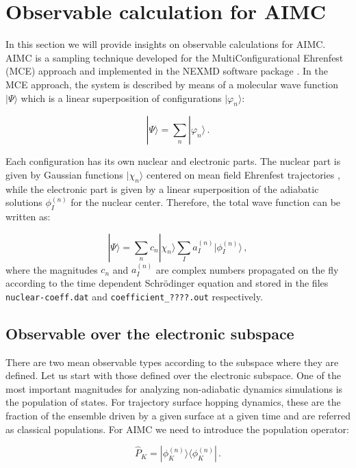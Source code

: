 \section{Observable calculation for AIMC}

In this section we will provide insights on observable calculations for AIMC. AIMC is a sampling technique developed for the MultiConfigurational Ehrenfest (MCE) approach and implemented in the NEXMD software package \cite{freixas2018ab}. In the MCE approach, the system is described by means of a molecular wave function $|\Psi\rangle$ which is a linear superposition of configurations $|\varphi_n\rangle$:

\begin{equation}
    |\Psi\rangle = \sum_n|\varphi_n\rangle\,.
\end{equation}

Each configuration has its own nuclear and electronic parts. The nuclear part is given by Gaussian functions $|\chi_n\rangle$ centered on mean field Ehrenfest trajectories \cite{freixas2018ab}, while the electronic part is given by a linear superposition of the adiabatic solutions $\phi_I^{(n)}$ for the nuclear center. Therefore, the total wave function can be written as:

\begin{equation}
    |\Psi\rangle = \sum_nc_n|\chi_n\rangle\sum_Ia_I^{(n)}|\phi_I^{(n)}\rangle\,,
\end{equation}
where the magnitudes $c_n$ and $a_I^{(n)}$ are complex numbers propagated on the fly according to the time dependent Schrödinger equation and stored in the files \verb+nuclear-coeff.dat+ and \verb+coefficient_????.out+ respectively.

\subsection{Observable over the electronic subspace}
There are two mean observable types according to the subspace where they are defined. Let us start with those defined over the electronic subspace. One of the most important magnitudes for analyzing non-adiabatic dynamics simulations is the population of states. For trajectory surface hopping dynamics, these are the fraction of the ensemble driven by a given surface at a given time and are referred as classical populations. For AIMC we need to introduce the population operator:

\begin{equation}
    \hat P_K = |\phi_K^{(n)}\rangle\langle\phi_K^{(n)}|\,.\label{popK}
\end{equation}

